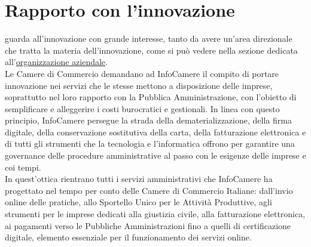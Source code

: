 \section{Rapporto con l'innovazione}
\label{sec:rapporto_con_innovazione}
\nomeAzienda guarda all'innovazione con grande interesse, tanto da avere un'area direzionale che tratta la materia dell'innovazione, come si può vedere nella sezione dedicata all'\hyperref[sec:organizzazione_aziendale]{organizzazione aziendale}. \\
Le Camere di Commercio demandano ad InfoCamere il compito di portare innovazione nei servizi che le stesse mettono a disposizione delle imprese, soprattutto nel loro rapporto con la Pubblica Amministrazione, con l'obietto di semplificare e alleggerire i costi burocratici e gestionali. In linea con questo principio, InfoCamere persegue la strada della dematerializzazione, della firma digitale, della conservazione sostitutiva della carta, della fatturazione elettronica e di tutti gli strumenti che la tecnologia e l'informatica offrono per garantire una governance delle procedure amministrative al passo con le esigenze delle imprese e coi tempi. \\
In quest'ottica rientrano tutti i servizi amministrativi che InfoCamere ha progettato nel tempo per conto delle Camere di Commercio Italiane: dall'invio online delle pratiche, allo Sportello Unico per le Attività Produttive, agli strumenti per le imprese dedicati alla giustizia civile, alla fatturazione elettronica, ai pagamenti verso le Pubbliche Amministrazioni fino a quelli di certificazione digitale, elemento essenziale per il funzionamento dei servizi online.

